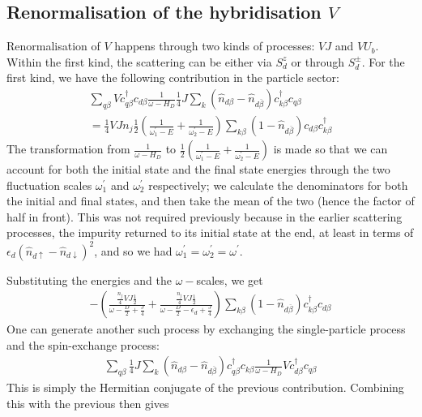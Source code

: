 \documentclass[reprint,superscriptaddress,floatfix]{revtex4-2}
\begin{document}
\subsection{Renormalisation of the hybridisation \(V\)}
Renormalisation of \(V\) happens through two kinds of processes: \(VJ\) and \(VU_b\). Within the first kind, the scattering can be either via \(S_d^z\) or through \(S_d^\pm\). For the first kind, we have the following contribution in the particle sector:
\begin{equation}\begin{aligned}
	\sum_{q\beta} Vc^\dagger_{q\beta} c_{d\beta} \frac{1}{\omega - H_D}\frac{1}{4}J \sum_{k} \left(\hat n_{d\beta} - \hat n_{d\overline\beta}\right) c^\dagger_{k\beta}c_{q\beta} \\
	= \frac{1}{4}V J n_j \frac{1}{2}\left(\frac{1}{\omega^\prime_1 - E} + \frac{1}{\omega^\prime_2 - E}\right)\sum_{k\beta} \left(1 - \hat n_{d\overline\beta}\right) c_{d\beta}c^\dagger_{k\beta}
\end{aligned}\end{equation}
The transformation from \(\frac{1}{\omega - H_D}\) to \(\frac{1}{2}\left(\frac{1}{\omega^\prime_1 - E} + \frac{1}{\omega^\prime_2 - E}\right)\) is made so that we can account for both the initial state and the final state energies through the two fluctuation scales \(\omega^\prime_1\) and \(\omega_2^\prime\) respectively; we calculate the denominators for both the initial and final states, and then take the mean of the two (hence the factor of half in front). This was not required previously because in the earlier scattering processes, the impurity returned to its initial state at the end, at least in terms of \(\epsilon_d \left( \hat n_{d \uparrow} - \hat n_{d \downarrow} \right)^2 \), and so we had \(\omega_1^\prime = \omega_2^\prime = \omega^\prime\).

Substituting the energies and the \(\omega-\)scales, we get
\begin{equation}\begin{aligned}
	-\left(\frac{\frac{n_j}{4}V J \frac{1}{2}}{\omega - \frac{D}{2} + \frac{J}{4}} + \frac{\frac{n_j}{4}V J \frac{1}{2}}{\omega - \frac{D}{2} - \epsilon_d + \frac{J}{4}}\right)\sum_{k\beta}\left(1 - \hat n_{d\overline\beta}\right) c^\dagger_{k\beta} c_{d\beta}
\end{aligned}\end{equation}
One can generate another such process by exchanging the single-particle process and the spin-exchange process:
\begin{equation}\begin{aligned}
	\sum_{q\beta} \frac{1}{4}J \sum_{k} \left(\hat n_{d\beta} - \hat n_{d\overline\beta}\right) c^\dagger_{q\beta}c_{k\beta} \frac{1}{\omega - H_D} V c^\dagger_{d\beta} c_{q\beta}
\end{aligned}\end{equation}
This is simply the Hermitian conjugate of the previous contribution. Combining this with the previous then gives
\end{document}
